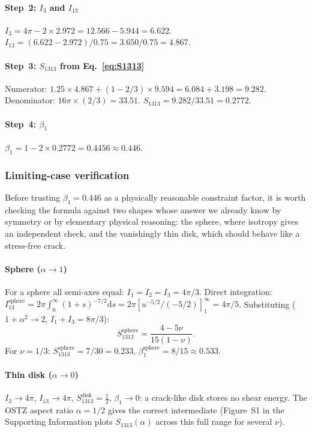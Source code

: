 \documentclass[3p]{elsarticle}
\newcommand{\half}{\tfrac{1}{2}}
\begin{document}
\paragraph{Step~2: $I_3$ and $I_{13}$}
$I_3=4\pi-2\times2.972=12.566-5.944=\mathbf{6.622}$.
$I_{13}=(6.622-2.972)/0.75=3.650/0.75=\mathbf{4.867}$.

\paragraph{Step~3: $S_{1313}$ from Eq.~\eqref{eq:S1313}}
Numerator: $1.25\times4.867+(1-2/3)\times9.594
=6.084+3.198=9.282$.
Denominator: $16\pi\times(2/3)=33.51$.
$S_{1313}=9.282/33.51=\mathbf{0.2772}$.

\paragraph{Step~4: $\beta_1$}
$\beta_1=1-2\times0.2772=\mathbf{0.4456}\approx0.446$.

\subsubsection{Limiting-case verification}
\label{sec:limits}

Before trusting $\beta_1=0.446$ as a physically reasonable
constraint factor, it is worth checking the formula against two
shapes whose answer we already know by symmetry or by elementary
physical reasoning: the sphere, where isotropy gives an independent
check, and the vanishingly thin disk, which should behave like a
stress-free crack.

\paragraph{Sphere ($\alpha\to1$)}
For a sphere all semi-axes equal: $I_1=I_2=I_3=4\pi/3$.
Direct integration:
$I_{13}^\text{sphere}=2\pi\int_0^\infty(1+s)^{-7/2}\mathrm ds
=2\pi[u^{-5/2}/(-5/2)]_1^\infty=4\pi/5$.
Substituting ($1+\alpha^2\to2$, $I_1+I_3=8\pi/3$):
\begin{equation}
  S_{1313}^\text{sphere}=\frac{4-5\nu}{15(1-\nu)}.
  \label{eq:S1313sphere}
\end{equation}
For $\nu=1/3$: $S_{1313}^\text{sphere}=7/30=0.233$,
$\beta_1^\text{sphere}=8/15\approx0.533$.

\paragraph{Thin disk ($\alpha\to0$)}
$I_3\to4\pi$, $I_{13}\to4\pi$, $S_{1313}^\text{disk}=\half$,
$\beta_1\to0$: a crack-like disk stores no shear energy.
The OSTZ aspect ratio $\alpha=1/2$ gives the correct intermediate
(Figure~S1 in the Supporting Information plots $S_{1313}(\alpha)$
across this full range for several $\nu$).
\end{document}
